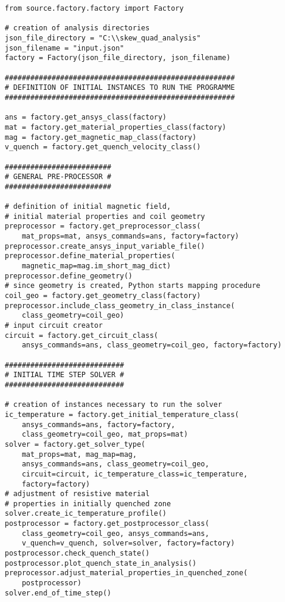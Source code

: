 
\renewcommand{\baselinestretch}{0.8} 
\begin{verbatim}
from source.factory.factory import Factory

# creation of analysis directories
json_file_directory = "C:\\skew_quad_analysis"
json_filename = "input.json"
factory = Factory(json_file_directory, json_filename)

######################################################
# DEFINITION OF INITIAL INSTANCES TO RUN THE PROGRAMME
######################################################

ans = factory.get_ansys_class(factory)
mat = factory.get_material_properties_class(factory)
mag = factory.get_magnetic_map_class(factory)
v_quench = factory.get_quench_velocity_class()

#########################
# GENERAL PRE-PROCESSOR #
#########################

# definition of initial magnetic field, 
# initial material properties and coil geometry
preprocessor = factory.get_preprocessor_class(
    mat_props=mat, ansys_commands=ans, factory=factory)
preprocessor.create_ansys_input_variable_file()
preprocessor.define_material_properties(
    magnetic_map=mag.im_short_mag_dict)
preprocessor.define_geometry()
# since geometry is created, Python starts mapping procedure
coil_geo = factory.get_geometry_class(factory)
preprocessor.include_class_geometry_in_class_instance(
    class_geometry=coil_geo)
# input circuit creator
circuit = factory.get_circuit_class(
    ansys_commands=ans, class_geometry=coil_geo, factory=factory)

############################
# INITIAL TIME STEP SOLVER #
############################

# creation of instances necessary to run the solver
ic_temperature = factory.get_initial_temperature_class(
    ansys_commands=ans, factory=factory,
    class_geometry=coil_geo, mat_props=mat)
solver = factory.get_solver_type(
    mat_props=mat, mag_map=mag, 
    ansys_commands=ans, class_geometry=coil_geo,
    circuit=circuit, ic_temperature_class=ic_temperature, 
    factory=factory)
# adjustment of resistive material 
# properties in initially quenched zone
solver.create_ic_temperature_profile()
postprocessor = factory.get_postprocessor_class(
    class_geometry=coil_geo, ansys_commands=ans,
    v_quench=v_quench, solver=solver, factory=factory)
postprocessor.check_quench_state()
postprocessor.plot_quench_state_in_analysis()
preprocessor.adjust_material_properties_in_quenched_zone(
    postprocessor)
solver.end_of_time_step()


\end{verbatim}
